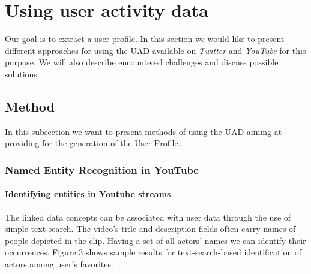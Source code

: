 \section{Using user activity data}
Our goal is to extract a user profile. In this section we would like to present different approaches for using the UAD
available on \textit{Twitter} and \textit{YouTube} for this purpose. We will also describe encountered challenges and
discuss possible solutions.

\subsection{Method}
In this subsection we want to present methods of using the UAD aiming at providing for the generation of the User Profile.
\subsubsection{Named Entity Recognition in YouTube}

\paragraph{Identifying entities in Youtube streams}
The linked data concepts can be associated with user data through the use of
simple text search. The video's title and description fields often carry names
of people depicted in the clip. Having a set of all actors' names we can
identify their occurrences. Figure 3 shows sample results for text-search-based
identification of actors among user's favorites.

